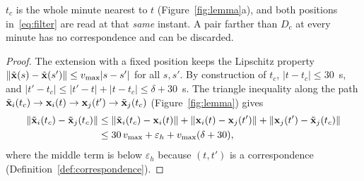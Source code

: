 \begin{inwords}
$t_c$ is the whole minute nearest to $t$ (Figure~\ref{fig:lemma}a), and both positions
in~\eqref{eq:filter} are read at that \emph{same} instant. A pair farther than $D_c$ at every
minute has no correspondence and can be discarded.
\end{inwords}

\begin{proof}
The extension with a fixed position keeps the Lipschitz property
$\|\tilde{\mathbf{x}}(s)-\tilde{\mathbf{x}}(s')\|\le v_{\max}|s-s'|$ for all $s,s'$. By construction of $t_c$,
$|t-t_c|\le30$~s, and $|t'-t_c|\le|t'-t|+|t-t_c|\le\delta+30$~s. The triangle inequality along
the path $\tilde{\mathbf{x}}_i(t_c)\to\mathbf{x}_i(t)\to\mathbf{x}_j(t')\to\tilde{\mathbf{x}}_j(t_c)$ (Figure~\ref{fig:lemma}) gives
\begin{align*}
  \|\tilde{\mathbf{x}}_i(t_c)-\tilde{\mathbf{x}}_j(t_c)\|
  &\le \|\tilde{\mathbf{x}}_i(t_c)-\mathbf{x}_i(t)\| + \|\mathbf{x}_i(t)-\mathbf{x}_j(t')\| + \|\mathbf{x}_j(t')-\tilde{\mathbf{x}}_j(t_c)\|\\
  &\le 30\,v_{\max} + \varepsilon_h + v_{\max}(\delta+30),
\end{align*}
where the middle term is below $\varepsilon_h$ because $(t,t')$ is a correspondence
(Definition~\ref{def:correspondence}).
\end{proof}

